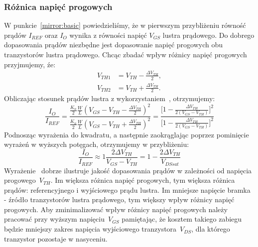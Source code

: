 \documentclass[twoside,pl,final]{labman}
\begin{document}
\subsubsection{Różnica napięć progowych}
\label{mirror:matching:vth}
W punkcie~\ref{mirror:basic} powiedzieliśmy,
że w pierwszym przybliżeniu równość prądów $I_{REF}$ oraz $I_O$
wynika z równości napięć $V_{GS}$ lustra prądowego.
Do dobrego dopasowania prądów niezbędne jest dopasowanie
napięć progowych obu tranzystorów lustra prądowego.
Chcąc zbadać wpływ różnicy napięć progowych przyjmujemy, źe:
\begin{eqnarray}
  V_{TH1} &= V_{TH} - \frac{\Delta V_{TH}}{2}, \nonumber \\
  V_{TH2} &= V_{TH} + \frac{\Delta V_{TH}}{2}.
  \label{eqn:matching:vth}
\end{eqnarray}
Obliczając stosunek prądów lustra z
wykorzystaniem~, otrzymujemy:
\begin{equation}
  \frac{I_O}{I_{REF}} = \frac{\frac{K_n}{2} \frac{W}{L} (V_{GS} - V_{TH} - \frac{\Delta V_{TH}}{2})^2}
    {\frac{K_n}{2} \frac{W}{L} (V_{GS} - V_{TH} + \frac{\Delta V_{TH}}{2})^2} =
    \frac{\big[1 - \frac{\Delta V_{TH}}{2 (V_{GS} - V_{TH})}\big]^2}
    {\big[1 - \frac{\Delta V_{TH}}{2 (V_{GS} - V_{TH})}\big]^2}
  \label{eqn:matching:vth:ratio}
\end{equation}
Podnosząc wyrażenia do kwadratu, a następnie zaokrąglając poprzez pominięcie
wyrażeń w wyższych potęgach, otrzymujemy w przybliżeniu:
\begin{equation}
  \frac{I_O}{I_{REF}} \approx 1 \frac{2 \Delta V_{TH}}{V_{GS} - V_{TH}} =
    1 - \frac{2 \Delta V_{TH}}{V_{DSsat}}
  \label{eqn:matching:vth:approx}
\end{equation}
Wyrażenie~ dobrze ilustruje jakość
dopasowania prądów w zależności od napięcia progowego~$V_{TH}$.
Im większa różnica napięć progowych, tym większa różnica prądów:
referencyjnego i wyjściowego prądu lustra.
Im mniejsze napięcie bramka - źródło tranzystorów lustra prądowego,
tym większy wpływ różnicy napięć progowych.
Aby zminimalizować wpływ różnicy napięć progowych należy pracować przy
wyższym napięciu~$V_{GS}$ pamiętając, że kosztem takiego zabiegu będzie
mniejszy zakres napięcia wyjściowego tranzystora~$V_{DS}$,
dla którego tranzystor pozostaje w nasyceniu.
\end{document}
